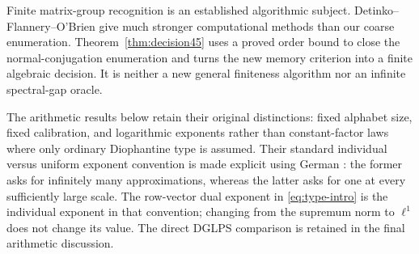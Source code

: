 Finite matrix-group recognition is an established algorithmic subject. Detinko--Flannery--O'Brien \cite[Sections 3.1--3.2 and 4]{DFO} give much stronger computational methods than our coarse enumeration. Theorem~\ref{thm:decision45} uses a proved order bound to close the normal-conjugation enumeration and turns the new memory criterion into a finite algebraic decision. It is neither a new general finiteness algorithm nor an infinite spectral-gap oracle.

The arithmetic results below retain their original distinctions: fixed alphabet size, fixed calibration, and logarithmic exponents rather than constant-factor laws where only ordinary Diophantine type is assumed. Their standard individual versus uniform exponent convention is made explicit using German \cite[Definitions 1--2]{German}: the former asks for infinitely many approximations, whereas the latter asks for one at every sufficiently large scale. The row-vector dual exponent in \eqref{eq:type-intro} is the individual exponent in that convention; changing from the supremum norm to $\ell^1$ does not change its value. The direct DGLPS comparison is retained in the final arithmetic discussion.
